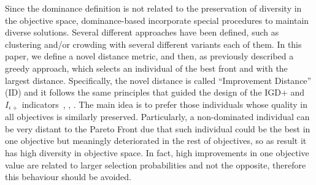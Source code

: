 Since the dominance definition is not related to the preservation of diversity in the objective space,
dominance-based \MOEAS{} incorporate special procedures to maintain diverse solutions.
%
Several different approaches have been defined, such as clustering and/or crowding with several different 
variants each of them.
%
In this paper, we define a novel distance metric, and then, as previously described a greedy approach, which selects an individual of the best front and with the largest distance.
%
Specifically, the novel distance is called ``Improvement Distance'' (ID) and it 
follows the same principles that guided the design of the IGD+ and $I_{\epsilon +}$ indicators~\cite{Joel:Inverted_Generational_Distance_Plus}, \cite{Joel:IBEA}, \cite{zitzler2003performance}.
%
The main idea is to prefer those individuals whose quality in all objectives is similarly preserved.
%
Particularly, a non-dominated individual can be very distant to the Pareto Front due that such individual could be the best in one objective but meaningly deteriorated in the rest of objectives, so as result it has high diversity in objective space.
%
In fact, high improvements in one objective value are related to larger selection probabilities and not the opposite, therefore this behaviour should be avoided.
%

